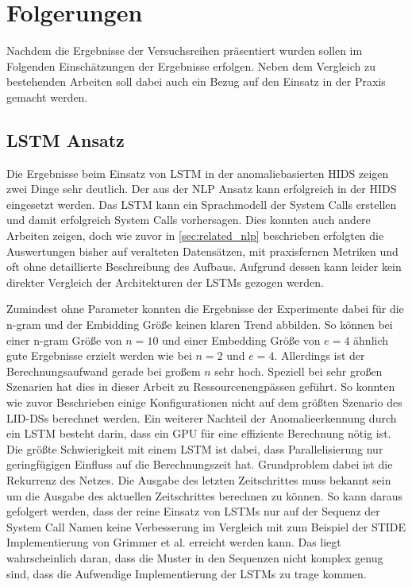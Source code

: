 \chapter{Folgerungen}\label{ch:folgerungen}
Nachdem die Ergebnisse der Versuchsreihen präsentiert wurden sollen im Folgenden Einschätzungen der Ergebnisse erfolgen.
Neben dem Vergleich zu bestehenden Arbeiten soll dabei auch ein Bezug auf den Einsatz in der Praxis gemacht werden.
\section{LSTM Ansatz}

Die Ergebnisse beim Einsatz von \ac{LSTM} in der anomaliebasierten \ac{HIDS} zeigen zwei Dinge sehr deutlich.
Der aus der \ac{NLP} Ansatz kann erfolgreich in der \ac{HIDS} eingesetzt werden.
Das \ac{LSTM} kann ein Sprachmodell der System Calls erstellen und damit erfolgreich System Calls vorhersagen.
Dies konnten auch andere Arbeiten zeigen, doch wie zuvor in \autoref{sec:related_nlp} beschrieben erfolgten die Auswertungen bisher auf veralteten Datensätzen, mit praxisfernen Metriken und oft ohne detaillierte Beschreibung des Aufbaus.
Aufgrund dessen kann leider kein direkter Vergleich der Architekturen der \acp{LSTM} gezogen werden.

Zumindest ohne Parameter konnten die Ergebnisse der Experimente dabei für die n-gram und der Embidding Größe keinen klaren Trend abbilden.
So können bei einer n-gram Größe von $n=10$ und einer Embedding Größe von $e=4$ ähnlich gute Ergebnisse erzielt werden wie bei $n=2$ und $e=4$.
Allerdings ist der Berechnungsaufwand gerade bei großem $n$ sehr hoch.
Speziell bei sehr großen Szenarien hat dies in dieser Arbeit zu Ressourcenengpässen geführt.
So konnten wie zuvor Beschrieben einige Konfigurationen nicht auf dem größten Szenario des \acp{LID-DS} berechnet werden.
Ein weiterer Nachteil der Anomalieerkennung durch ein \ac{LSTM} besteht darin, dass ein GPU für eine effiziente Berechnung nötig ist.
Die größte Schwierigkeit mit einem \ac{LSTM} ist dabei, dass Parallelisierung nur geringfügigen Einfluss auf die Berechnungszeit hat.
Grundproblem dabei ist die Rekurrenz des Netzes. 
Die Ausgabe des letzten Zeitschrittes muss bekannt sein um die Ausgabe des aktuellen Zeitschrittes berechnen zu können.
So kann daraus gefolgert werden, dass der reine Einsatz von \acp{LSTM} nur auf der Sequenz der System Call Namen keine Verbesserung im Vergleich mit zum Beispiel der \ac{STIDE} Implementierung von Grimmer et al.\cite{IDSTHREADGRIMMER2021} erreicht werden kann.
Das liegt wahrscheinlich daran, dass die Muster in den Sequenzen nicht komplex genug sind, dass die Aufwendige Implementierung der \acp{LSTM} zu trage kommen.


